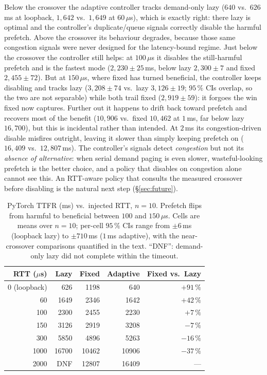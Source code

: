 \documentclass[journal]{IEEEtran}
\begin{document}
Below the crossover the adaptive controller tracks demand-only lazy
($640$ vs.\ $626$\,ms at loopback, $1{,}642$ vs.\ $1{,}649$ at $60\,\mu$s),
which is exactly right: there lazy is optimal and the controller's
duplicate/queue signals correctly disable the harmful prefetch. Above the
crossover its behaviour degrades, because those same congestion signals were
never designed for the latency-bound regime. Just below the crossover the
controller still helps: at $100\,\mu$s it disables the still-harmful prefetch
and is the fastest mode ($2{,}230\!\pm\!25$\,ms, below lazy
$2{,}300\!\pm\!7$ and fixed $2{,}455\!\pm\!72$). But at $150\,\mu$s, where
fixed has turned beneficial, the controller keeps disabling and tracks lazy
($3{,}208\!\pm\!74$ vs.\ lazy $3{,}126\!\pm\!19$; $95\,\%$ CIs overlap, so the
two are not separable) while both trail fixed ($2{,}919\!\pm\!59$): it forgoes
the win fixed now captures. Further out it happens to drift back toward
prefetch and recovers most of the benefit ($10{,}906$ vs.\ fixed $10{,}462$
at $1$\,ms, far below lazy $16{,}700$), but this is incidental rather than
intended. At $2$\,ms its congestion-driven disable misfires outright, leaving
it slower than simply keeping prefetch on ($16{,}409$ vs.\ $12{,}807$\,ms).
The controller's signals detect \emph{congestion} but not its
\emph{absence of alternative}: when serial demand paging is even slower,
wasteful-looking prefetch is the better choice, and a policy that disables on
congestion alone cannot see this. An RTT-aware policy that consults the
measured crossover before disabling is the natural next step
(\S\ref{sec:future}).

\begin{table}[t]
\centering
\caption{PyTorch TTFR (ms) vs.\ injected RTT, $n\!=\!10$. Prefetch flips
from harmful to beneficial between $100$ and $150\,\mu$s. Cells are means over
$n\!=\!10$; per-cell $95\,\%$ CIs range from $\pm6$\,ms (loopback lazy) to
$\pm710$\,ms ($1$\,ms adaptive), with the near-crossover comparisons quantified
in the text. ``DNF'': demand-only lazy did not complete within the timeout.}
\label{tab:crosshost}
\renewcommand{\arraystretch}{1.15}
\setlength{\tabcolsep}{4pt}
\small
\begin{tabular}{r r r r r}
\toprule
RTT ($\mu$s) & Lazy & Fixed & Adaptive & Fixed vs.\ Lazy \\
\midrule
0 (loopback) & 626   & 1198  & 640   & $+91\,\%$ \\
60           & 1649  & 2346  & 1642  & $+42\,\%$ \\
100          & 2300  & 2455  & 2230  & $+7\,\%$  \\
150          & 3126  & 2919  & 3208  & $-7\,\%$  \\
300          & 5850  & 4896  & 5263  & $-16\,\%$ \\
1000         & 16700 & 10462 & 10906 & $-37\,\%$ \\
2000         & {DNF} & 12807 & 16409 & --- \\
\bottomrule
\end{tabular}
\end{table}
\end{document}
